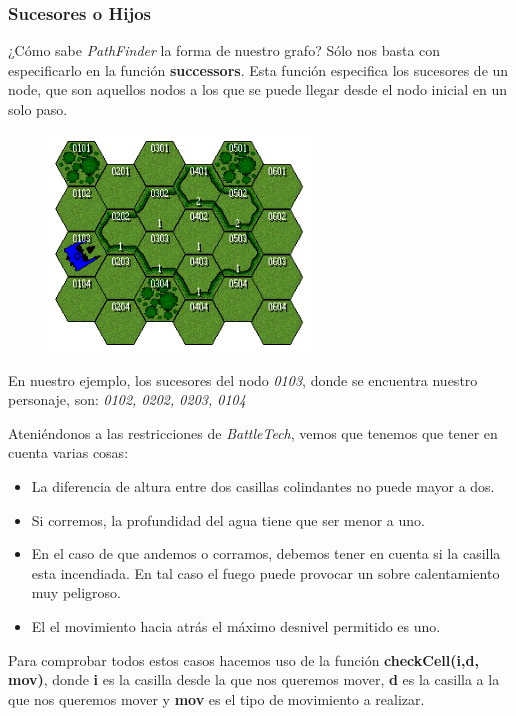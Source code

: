 \documentclass[a4paper,12pt,oneside]{book}
\begin{document}
\subsubsection{Sucesores o Hijos}

¿Cómo sabe {\it PathFinder} la forma de nuestro grafo? Sólo nos basta
con especificarlo en la función {\bf successors}. Esta función
especifica los sucesores de un node, que son aquellos nodos a los que
se puede llegar desde el nodo inicial en un solo paso. 

\begin{figure}[!h]
  \centering
  \includegraphics[width=7cm]{images/map2.png}
\end{figure}

En nuestro ejemplo, los sucesores del nodo {\it 0103}, donde se encuentra
nuestro personaje, son: {\it 0102, 0202, 0203, 0104}

Ateniéndonos a las restricciones de {\it BattleTech}, vemos que
tenemos que tener en cuenta varias cosas:

\begin{itemize}
\item La diferencia de altura entre dos casillas colindantes no puede
  mayor a dos.
\item Si corremos, la profundidad del agua tiene que ser menor a uno.
\item En el caso de que andemos o corramos, debemos tener en cuenta si
  la casilla esta incendiada. En tal caso el fuego puede provocar un
  sobre calentamiento muy peligroso.
\item El el movimiento hacia atrás el máximo desnivel permitido es uno.
\end{itemize}

Para comprobar todos estos casos hacemos uso de la función {\bf
  checkCell(i,d, mov)}, donde {\bf i} es la casilla desde la que nos
queremos mover, {\bf d} es la casilla a la que nos queremos mover y {\bf mov} es
el tipo de movimiento a realizar.
\end{document}
